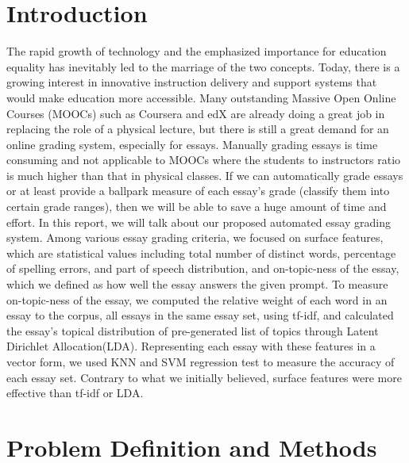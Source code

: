 \documentclass{article}
\begin{document}
 



\section{Introduction}
The rapid growth of technology and the emphasized importance for education equality has inevitably led to the marriage of the two concepts. Today, there is a growing interest in innovative instruction delivery and support systems that would make education more accessible. Many outstanding Massive Open Online Courses (MOOCs) such as Coursera and edX are already doing a great job in replacing the role of a physical lecture, but there is still a great demand for an online grading system, especially for essays. Manually grading essays is time consuming and not applicable to MOOCs where the students to instructors ratio is much higher than that in physical classes. If we can automatically grade essays or at least provide a ballpark measure of each essay’s grade (classify them into certain grade ranges), then we will be able to save a huge amount of time and effort. In this report, we will talk about our proposed automated essay grading system.
Among various essay grading criteria, we focused on surface features, which are statistical values including total number of distinct words, percentage of spelling errors, and part of speech distribution, and on-topic-ness of the essay, which we defined as how well the essay answers the given prompt. To measure on-topic-ness of the essay, we computed the relative weight of each word in an essay to the corpus, all essays in the same essay set, using tf-idf, and calculated the essay’s topical distribution of pre-generated list of topics through Latent Dirichlet Allocation(LDA). Representing each essay with these features in a vector form, we used KNN and SVM regression test to measure the accuracy of each essay set. Contrary to what we initially believed, surface features were more effective than tf-idf or LDA.


\section{Problem Definition and Methods} 
\end{document}
